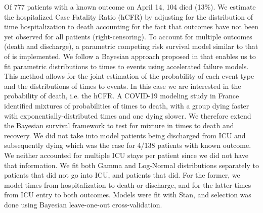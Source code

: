 Of 777 patients with a known outcome on April 14, 104 died (13\%). 
We estimate the hospitalized Case Fatality Ratio (hCFR) by adjusting for the distribution of time hospitalization to death accounting for the fact that outcomes have not been yet observed for all patients (right-censoring). To account for multiple outcomes (death and discharge), a parametric competing risk survival model similar to that of\cite{Ghani:MethodsEstimatingCase:2005} is implemented. We follow a Bayesian approach proposed in\cite{Bellot:TreebasedBayesianMixture:2018} that enables us to fit parametric distributions to times to events using accelerated failure models. This method allows for the joint estimation of the probability of each event type and the distributions of times to events. In this case we are interested in the probability of death, i.e. the hCFR. A COVID-19 modeling study in France identified mixtures of probabilities of times to death, with a group dying faster with exponentially-distributed times and one dying slower\cite{Salje:EstimatingBurdenSARSCoV2:2020}. We therefore extend the Bayesian survival framework to test for mixture in times to death and recovery. We did not take into model patients being discharged from ICU and subsequently dying which was the case for 4/138 patients with known outcome. We neither accounted for multiple ICU stays per patient since we did not have that information. We fit both Gamma and Log-Normal distributions separately to patients that did not go into ICU, and patients that did. For the former, we model times from hospitalization to death or discharge, and for the latter times from ICU entry to both outcomes. Models were fit with Stan\cite{Carpenter:StanProbabilisticProgramming:2017}, and selection was done using Bayesian leave-one-out cross-validation\cite{Vehtari:PracticalBayesianModel:2017}. \\
